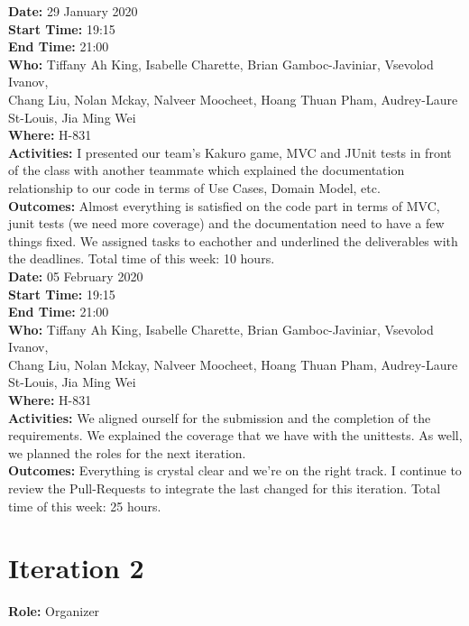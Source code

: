 \documentclass[12pt]{article}
\begin{document}
{\bf Date:} 29 January 2020\\
{\bf Start Time:} 19:15\\
{\bf End Time:} 21:00\\
{\bf Who:} Tiffany Ah King, Isabelle Charette, Brian Gamboc-Javiniar, Vsevolod Ivanov,\\
Chang Liu, Nolan Mckay, Nalveer Moocheet, Hoang Thuan Pham, Audrey-Laure St-Louis, Jia Ming Wei\\
{\bf Where:} H-831\\
{\bf Activities:} I presented our team's Kakuro game, MVC and JUnit tests in front of the class with another teammate which explained the documentation relationship to our code in terms of Use Cases, Domain Model, etc.\\
{\bf Outcomes:} Almost everything is satisfied on the code part in terms of MVC, junit tests (we need more coverage) and the documentation need to have a few things fixed. We assigned tasks to eachother and underlined the deliverables with the deadlines. Total time of this week: 10 hours.\\

{\bf Date:} 05 February 2020\\
{\bf Start Time:} 19:15\\
{\bf End Time:} 21:00\\
{\bf Who:} Tiffany Ah King, Isabelle Charette, Brian Gamboc-Javiniar, Vsevolod Ivanov,\\
Chang Liu, Nolan Mckay, Nalveer Moocheet, Hoang Thuan Pham, Audrey-Laure St-Louis, Jia Ming Wei\\
{\bf Where:} H-831\\
{\bf Activities:} We aligned ourself for the submission and the completion of the requirements. We explained the coverage that we have with the unittests. As well, we planned the roles for the next iteration.\\
{\bf Outcomes:} Everything is crystal clear and we're on the right track. I continue to review the Pull-Requests to integrate the last changed for this iteration. Total time of this week: 25 hours.\\


\section{Iteration 2}

{\bf Role:} Organizer\\
\end{document}
